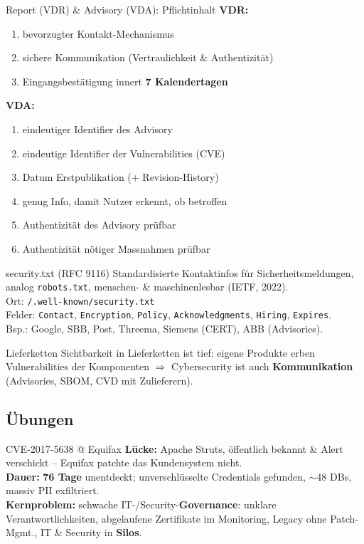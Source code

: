 \documentclass[a4paper, fontsize=7pt]{scrartcl}
\begin{document}
\begin{mainbox}{Report (VDR) \& Advisory (VDA): Pflichtinhalt}
\textbf{VDR:}
\begin{enumerate}
    \item bevorzugter Kontakt-Mechanismus
    \item sichere Kommunikation (Vertraulichkeit \& Authentizität)
    \item Eingangsbestätigung innert \textbf{7 Kalendertagen}
\end{enumerate}
\textbf{VDA:}
\begin{enumerate}
    \item eindeutiger Identifier des Advisory
    \item eindeutige Identifier der Vulnerabilities (CVE)
    \item Datum Erstpublikation (+ Revision-History)
    \item genug Info, damit Nutzer erkennt, ob betroffen
    \item Authentizität des Advisory prüfbar
    \item Authentizität nötiger Massnahmen prüfbar
\end{enumerate}
\end{mainbox}

\begin{mainbox}{security.txt (RFC 9116)}
Standardisierte Kontaktinfos für Sicherheitsmeldungen, analog
\texttt{robots.txt}, menschen- \& maschinenlesbar (IETF, 2022).\\
Ort: \texttt{/.well-known/security.txt}\\
Felder: \texttt{Contact}, \texttt{Encryption}, \texttt{Policy},
\texttt{Acknowledgments}, \texttt{Hiring}, \texttt{Expires}.\\
Bsp.: Google, SBB, Post, Threema, Siemens (CERT), ABB (Advisories).
\end{mainbox}

\begin{subbox}{Lieferketten}
Sichtbarkeit in Lieferketten ist tief: eigene Produkte erben
Vulnerabilities der Komponenten $\Rightarrow$ Cybersecurity ist auch
\textbf{Kommunikation} (Advisories, SBOM, CVD mit Zulieferern).
\end{subbox}

\subsection{Übungen}

\begin{subbox}{CVE-2017-5638 @ Equifax}
\textbf{Lücke:} Apache Struts, öffentlich bekannt \& Alert verschickt --
Equifax patchte das Kundensystem nicht.\\
\textbf{Dauer:} \textbf{76 Tage} unentdeckt; unverschlüsselte
Credentials gefunden, $\sim$48 DBs, massiv PII exfiltriert.\\
\textbf{Kernproblem:} schwache IT-/Security-\textbf{Governance}: unklare
Verantwortlichkeiten, abgelaufene Zertifikate im Monitoring, Legacy ohne
Patch-Mgmt., IT \& Security in \textbf{Silos}.
\end{subbox}
\end{document}
